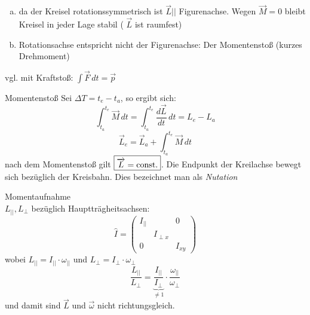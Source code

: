 \documentclass[a4paper,10pt]{scrartcl}
\begin{document}
\begin{sg}
\begin{enumerate}[a)]
 \item da der Kreisel rotationssymmetrisch ist $\vec L || $ Figurenachse. Wegen $\vec M=0$ bleibt Kreisel in jeder Lage stabil ( $\vec L$ ist raumfest)
 \item Rotationsachse entspricht nicht der Figurenachse:
Der Momentenstoß (kurzes Drehmoment)
\end{enumerate}

\begin{note}
 vgl. mit Kraftstoß: $\int \vec F \, dt= \vec p$
\end{note}
\begin{seg}{Momentenstoß}
 Sei $\Delta T= t_e-t_a$, so ergibt sich:
\[
 \int_{t_a}^{t_e} \vec M\, dt= \int_{t_a}^{t_e} \frac{d\vec{L}}{dt}\, dt= L_e-L_a
\]
\[
 \vec L_e= \vec L_a+ \int_{t_a}^{t_e}\vec M \, dt 
\]
nach dem Momentenstoß gilt $\boxed{\overrightarrow{L}=\text{const}.}$.  Die Endpunkt der Kreilachse bewegt sich bezüglich der Kreisbahn. Dies bezeichnet man als \emph{Nutation}
\end{seg}
\begin{seg}{Momentaufnahme}
 \\
$L_{||}, L_\perp$ bezüglich Hauptträgheitsachsen:
\[
\hat I= \begin{pmatrix} I_{||} & & 0 \\ & I_{\perp x} & \\ 0 & & I_{xy} \end{pmatrix} %
\]
wobei $L_{||}= I_{||}\cdot \omega_{||}$ und $L_{\perp}=I_\perp \cdot \omega_\perp$
\[
 \frac{L_{||}}{L_\perp}=\underbrace{\frac{I_{||}}{I_\perp}}_{\neq 1} \cdot \frac{\omega_{||}}{\omega_\perp}
\]
und damit sind $\vec L$ und $\vec \omega$ nicht richtungsgleich.
\end{seg}
\end{sg}
\end{document}
